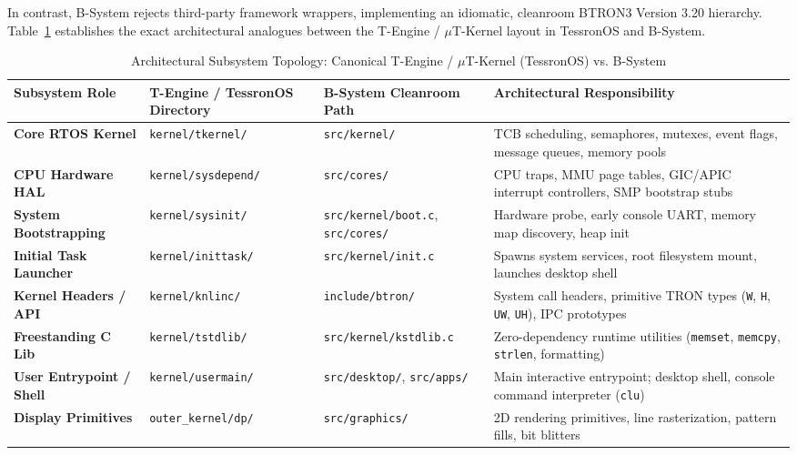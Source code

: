 \documentclass[10pt,journal,compsoc,twocolumn]{article}
\begin{document}
In contrast, B-System rejects third-party framework wrappers, implementing an idiomatic, cleanroom BTRON3 Version 3.20 hierarchy. Table~\ref{tab:tree_analogs} establishes the exact architectural analogues between the T-Engine / $\mu$T-Kernel layout in TessronOS and B-System.

\begin{table}[t]
\centering
\caption{Architectural Subsystem Topology: Canonical T-Engine / $\mu$T-Kernel (TessronOS) vs. B-System}
\label{tab:tree_analogs}
\scriptsize
\setlength{\tabcolsep}{5pt}
\renewcommand{\arraystretch}{1.12}
\begin{tabularx}{\textwidth}{@{} >{\raggedright\arraybackslash\bfseries}p{3.2cm} >{\raggedright\arraybackslash}p{3.8cm} >{\raggedright\arraybackslash}p{3.8cm} >{\raggedright\arraybackslash}X @{}}
\toprule
Subsystem Role & T-Engine / TessronOS Directory & B-System Cleanroom Path & Architectural Responsibility \\
\midrule
Core RTOS Kernel & \texttt{kernel/tkernel/} & \texttt{src/kernel/} & TCB scheduling, semaphores, mutexes, event flags, message queues, memory pools \\
CPU Hardware HAL & \texttt{kernel/sysdepend/} & \texttt{src/cores/} & CPU traps, MMU page tables, GIC/APIC interrupt controllers, SMP bootstrap stubs \\
System Bootstrapping & \texttt{kernel/sysinit/} & \texttt{src/kernel/boot.c}, \texttt{src/cores/} & Hardware probe, early console UART, memory map discovery, heap init \\
Initial Task Launcher & \texttt{kernel/inittask/} & \texttt{src/kernel/init.c} & Spawns system services, root filesystem mount, launches desktop shell \\
Kernel Headers / API & \texttt{kernel/knlinc/} & \texttt{include/btron/} & System call headers, primitive TRON types (\texttt{W}, \texttt{H}, \texttt{UW}, \texttt{UH}), IPC prototypes \\
Freestanding C Lib & \texttt{kernel/tstdlib/} & \texttt{src/kernel/kstdlib.c} & Zero-dependency runtime utilities (\texttt{memset}, \texttt{memcpy}, \texttt{strlen}, formatting) \\
User Entrypoint / Shell & \texttt{kernel/usermain/} & \texttt{src/desktop/}, \texttt{src/apps/} & Main interactive entrypoint; desktop shell, console command interpreter (\texttt{clu}) \\
\midrule
Display Primitives & \texttt{outer\_kernel/dp/} & \texttt{src/graphics/} & 2D rendering primitives, line rasterization, pattern fills, bit blitters \\

\end{tabularx}
\end{table}
\end{document}

